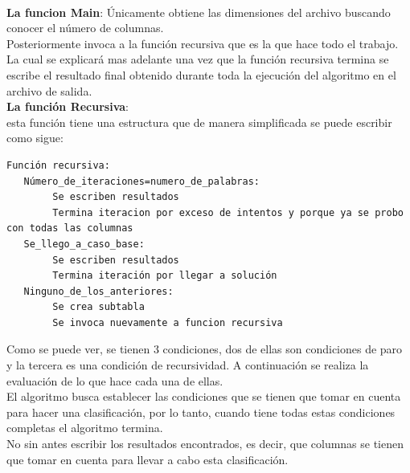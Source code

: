 \\
\textbf{La funcion Main}: Únicamente obtiene las dimensiones del archivo buscando conocer el número de columnas.\\
Posteriormente invoca a la función recursiva que es la que hace todo el trabajo. La cual se explicará mas adelante una vez que la función recursiva termina se escribe el resultado final obtenido durante toda la ejecución del algoritmo en el archivo de salida.\\
\textbf{La función Recursiva}:\\
esta función tiene una estructura que de manera simplificada se puede escribir como sigue:
 \begin{verbatim}
Función recursiva:
   Número_de_iteraciones=numero_de_palabras:
        Se escriben resultados
        Termina iteracion por exceso de intentos y porque ya se probo con todas las columnas
   Se_llego_a_caso_base:
        Se escriben resultados
        Termina iteración por llegar a solución 
   Ninguno_de_los_anteriores:
        Se crea subtabla
        Se invoca nuevamente a funcion recursiva
 \end{verbatim}
Como se puede ver, se tienen 3 condiciones, dos de ellas son condiciones de paro y la tercera es una condición de recursividad. A continuación se realiza la evaluación de lo que hace cada una de ellas. 
	\\
El algoritmo busca establecer las condiciones que se tienen que tomar en cuenta para hacer una clasificación, por lo tanto, cuando tiene todas estas condiciones completas el algoritmo termina. 
	\\
No sin antes escribir los resultados encontrados, es decir, que columnas se tienen que tomar en cuenta para llevar a cabo esta clasificación.
	\\ 
